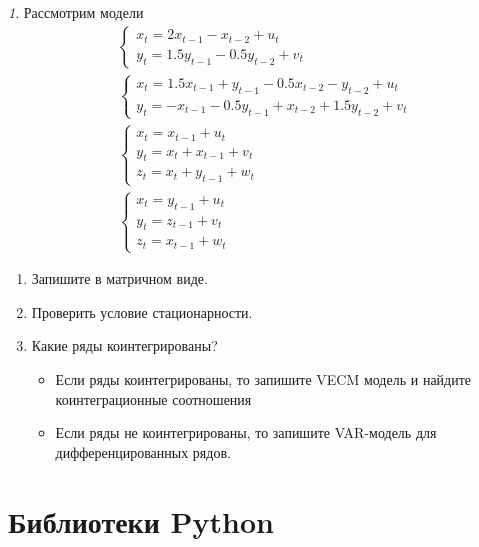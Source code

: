 \documentclass[12pt]{article}
\theoremstyle{remark}
\newtheorem{exercise}{}[subsection]
\begin{document}
\begin{exercise}
Рассмотрим модели
\begin{align*}
	& \begin{cases} x_t=2x_{t-1}-x_{t-2}+u_t \\ y_t=1.5y_{t-1}-0.5y_{t-2}+v_t \end{cases} \\
	& \begin{cases} x_t=1.5x_{t-1}+y_{t-1}-0.5x_{t-2}-y_{t-2}+u_t \\
	y_t=-x_{t-1}-0.5y_{t-1}+x_{t-2}+1.5y_{t-2}+v_t \end{cases} \\
	& \begin{cases} x_t=x_{t-1}+u_t \\ y_t=x_{t}+x_{t-1}+v_t \\ z_t= x_{t}+y_{t-1}+w_t \end{cases} \\
	& \begin{cases} x_t=y_{t-1}+u_t \\ y_t=z_{t-1}+v_t \\ z_t= x_{t-1}+w_t \end{cases}
\end{align*}
\begin{enumerate}
	\item Запишите в матричном виде.
	\item Проверить условие стационарности.
	\item Какие ряды коинтегрированы?
	\begin{itemize}
		\item Если ряды коинтегрированы, то запишите VECM модель
		и найдите коинтеграционные соотношения
		\item Если ряды не коинтегрированы, то запишите VAR-модель для дифференцированных рядов.
	\end{itemize}
\end{enumerate}
\end{exercise}

\newpage

\appendix

\section{Библиотеки Python}
\end{document}

